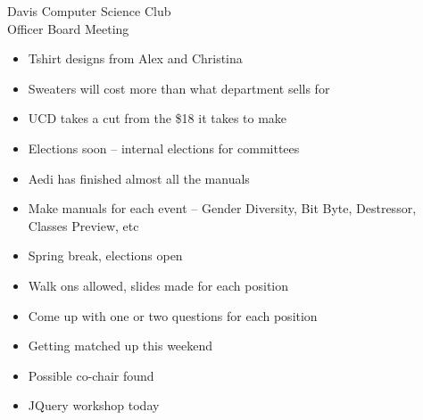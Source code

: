 \documentclass{article}
\begin{document}
\begin{Minutes}{Davis Computer Science Club\\Officer Board Meeting}




\maketitle

\begin{itemize}
    \item Tshirt designs from Alex and Christina
    \item Sweaters will cost more than what department sells for
    \item UCD takes a cut from the \$18 it takes to make
    \item Elections soon -- internal elections for committees
    \item Aedi has finished almost all the manuals
    \item Make manuals for each event -- Gender Diversity, Bit Byte, Destressor, Classes Preview, etc
\end{itemize}

\begin {itemize}
    \item Spring break, elections open
    \item Walk ons allowed, slides made for each position
    \item Come up with one or two questions for each position
\end {itemize}

\begin {itemize}
    \item Getting matched up this weekend
\end {itemize}


\begin {itemize} 
    \item Possible co-chair found 
    \item JQuery workshop today
\end {itemize}


\end{Minutes}
\end{document}
